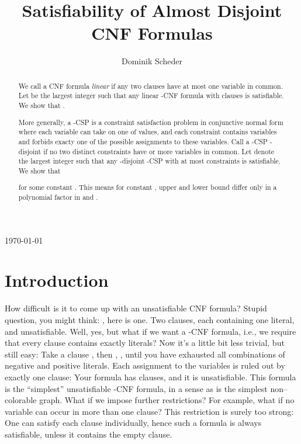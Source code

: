 \documentclass[envcountsect, envcountsame]{llncs}
\begin{document}
\frontmatter
\pagestyle{headings}
\title{Satisfiability of Almost Disjoint CNF Formulas}

\author{Dominik Scheder}
\maketitle
\begin{center}
 \today
\end{center}

\begin{abstract}
  We call a CNF formula {\em linear} if any two clauses have at most
  one variable in common. Let  be the largest integer  such that
  any linear -CNF formula with  clauses is satisfiable.
  We show that .

  More generally, a -CSP is a constraint satisfaction problem
  in conjunctive normal form where each variable can take on one of  
  values, and each constraint contains  variables and 
  forbids exacty one of the  possible assignments to these variables.
  Call a -CSP -disjoint if no two distinct constraints have
   or more variables in common. Let  denote the
  largest integer  such that any -disjoint -CSP with	
  at most  constraints is 
  satisfiable. We show that

  
  for some constant .  This means for constant , upper and
  lower bound differ only in a polynomial factor in  and .
\end{abstract}

\section{Introduction}

How difficult is it to come up with an unsatisfiable CNF formula?
Stupid question, you might think: , here is
one. Two clauses, each containing one literal, and unsatisfiable.
Well, yes, but what if we want a -CNF formula, i.e., we require
that every clause contains exactly  literals? Now it's a little bit
less trivial, but still easy: Take a clause ,
then , ,
until you have exhausted all  combinations of negative and
positive literals. Each assignment to the  variables is ruled out
by exactly one clause: Your formula has  clauses, and it is
unsatisfiable. This formula is the ``simplest'' unsatisfiable -CNF
formula, in a sense as  is the simplest non--colorable
graph. What if we impose further restrictions? For example, what if no
variable can occur in more than one clause? This restriction is surely
too strong: One can satisfy each clause individually, hence such
a formula is always satisfiable, unless it contains the empty clause.\\
\end{document}
